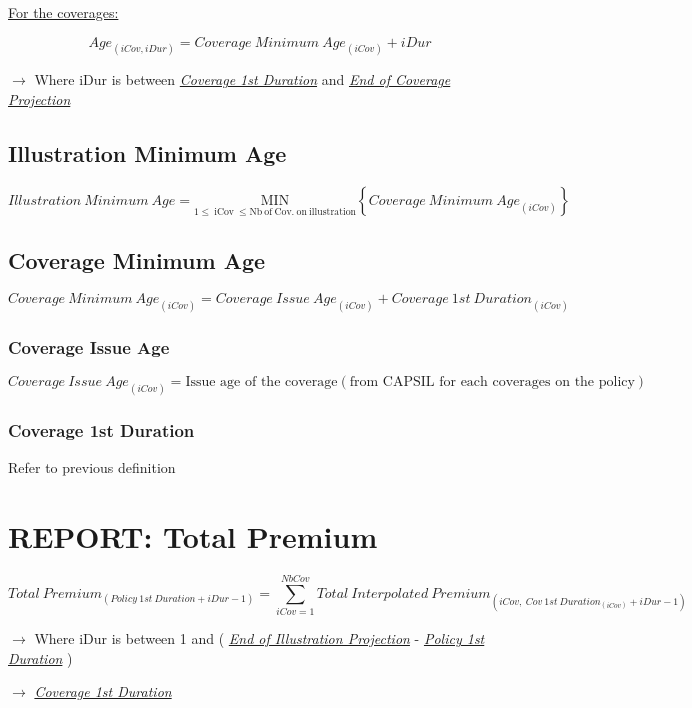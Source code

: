 \documentclass[10pt]{article}
\begin{document}
\underline{For the coverages:}

\[
{Age}_{\left(iCov,iDur\right)} = {Coverage\ Minimum\ Age}_{\left(iCov\right)} + iDur
\]

$\rightarrow$ Where iDur is between \underline{\textit{Coverage 1st Duration}} and \underline{\textit{End of Coverage Projection}}

\subsection{Illustration Minimum Age}

\[
Illustration\ Minimum\ Age = \operatorname{\underset{1\leq\ iCov\ \leq Nb\ of\ Cov.\ on\ illustration}{MIN}}{\left\{{Coverage\ Minimum\ Age}_{\left(iCov\right)}\right\}}
\]

\subsection{Coverage Minimum Age}

\[
{Coverage\ Minimum\ Age}_{\left(iCov\right)} = {Coverage\ Issue\ Age}_{\left(iCov\right)} + {Coverage\ 1st\ Duration}_{\left(iCov\right)}
\]

\subsubsection{Coverage Issue Age}

\[
{Coverage\ Issue\ Age}_{\left(iCov\right)} = \text{Issue age of the coverage} \left(\text{from CAPSIL for each coverages on the policy}\right)
\]

\subsubsection{Coverage 1st Duration}
Refer to previous definition

\section{REPORT: Total Premium}

\[
{Total\ Premium}_{\left(Policy\ 1st\ Duration+iDur-1\right)} = \sum_{iCov=1}^{NbCov} {Total\ Interpolated\ Premium}_{\left(iCov,{\ Cov\ 1st\ Duration}_{\left(iCov\right)}+iDur-1\right)}
\]

$\rightarrow$ Where iDur is between 1 and ( \underline{\textit{End of Illustration Projection}} - \underline{\textit{Policy 1st Duration}} )

$\rightarrow$ \underline{\textit{Coverage 1st Duration}}
\end{document}
